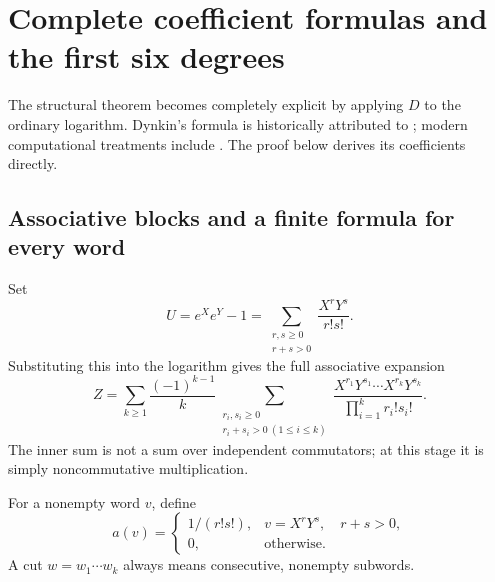 \section{Complete coefficient formulas and the first six degrees}\label{sec:coefficients}
The structural theorem becomes completely explicit by applying $D$ to the ordinary logarithm. Dynkin's formula is historically attributed to \cite{Dynkin}; modern computational treatments include \cite{CasasMurua}. The proof below derives its coefficients directly.

\subsection{Associative blocks and a finite formula for every word}
Set
\begin{equation}\label{eq:block-U}
 U=e^Xe^Y-1
   =\sum_{\substack{r,s\geq0\\r+s>0}}\frac{X^rY^s}{r!s!}.
\end{equation}
Substituting this into the logarithm gives the full associative expansion
\begin{equation}\label{eq:associative-all}
 Z=\sum_{k\geq1}\frac{(-1)^{k-1}}{k}
 \sum_{\substack{r_i,s_i\geq0\\r_i+s_i>0\ (1\leq i\leq k)}}
 \frac{X^{r_1}Y^{s_1}\cdots X^{r_k}Y^{s_k}}
 {\prod_{i=1}^k r_i!s_i!}.
\end{equation}
The inner sum is not a sum over independent commutators; at this stage it is simply noncommutative multiplication.

For a nonempty word $v$, define
\begin{equation}\label{eq:weight}
 a(v)=\begin{cases}
 1/(r!s!),&v=X^rY^s,\quad r+s>0,\\
 0,&\text{otherwise}.
 \end{cases}
\end{equation}
A cut $w=w_1\cdots w_k$ always means consecutive, nonempty subwords.


